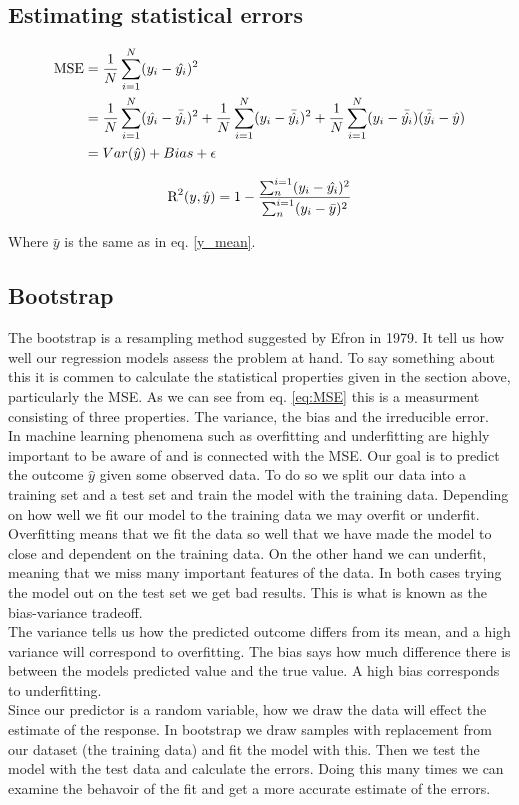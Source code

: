 \documentclass[a4paper,12pt, english]{article}
\begin{document}
\subsection*{Estimating statistical errors}

\begin{align} \label{eq:MSE}
\textnormal{MSE} &= \frac{1}{N} \sum_{i=1}^N (y_i - \hat{y_i})^2 \\
&= \frac{1}{N} \sum_{i=1}^N (\hat{y_i} - \bar{\hat{y_i}})^2 + \frac{1}{N} \sum_{i=1}^N (y_i - \bar{\hat{y_i}})^2 + \frac{1}{N} \sum_{i=1}^N (y_i - \bar{\hat{y_i}})(\bar{\hat{y_i}} - \hat{y}) \\
&= Var(\hat{y}) + Bias + \epsilon
\end{align}

\begin{equation}
\textnormal{R}^2(y,\hat{y}) = 1 - \frac{\sum_{n}^{i=1} (y_i - \hat{y_i})^2}{\sum_{n}^{i=1}(y_i - \bar{y})^2}
\end{equation}

Where $\bar{y}$ is the same as in eq. \ref{y_mean}.


\subsection*{Bootstrap}

The bootstrap is a resampling method suggested by Efron in 1979. It tell us how well our regression models assess the problem at hand. To say something about this it is commen to calculate the statistical properties given in the section above, particularly the MSE. As we can see from eq. \ref{eq:MSE} this is a measurment consisting of three properties. The variance, the bias and the irreducible error.	\\
In machine learning phenomena such as overfitting and underfitting are highly important to be aware of and is connected with the MSE. Our goal is to predict the outcome $\hat{y}$ given some observed data. To do so we split our data into a training set and a test set and train the model with the training data. Depending on how well we fit our model to the training data we may overfit or underfit. Overfitting means that we fit the data so well that we have made the model to close and dependent on the training data. 
On the other hand we can underfit, meaning that we miss many important features of the data. In both cases trying the model out on the test set we get bad results. This is what is known as the bias-variance tradeoff. \\
The variance tells us how the predicted outcome differs from its mean, and a high variance will correspond to overfitting. The bias says how much difference there is between the models predicted value and the true value. A high bias corresponds to underfitting. \\
Since our predictor is a random variable, how we draw the data will effect the estimate of the response. In bootstrap we draw samples with replacement from our dataset (the training data) and fit the model with this. Then we test the model with the test data and calculate the errors. Doing this many times we can examine the behavoir of the fit and get a more accurate estimate of the errors. 
\end{document}
